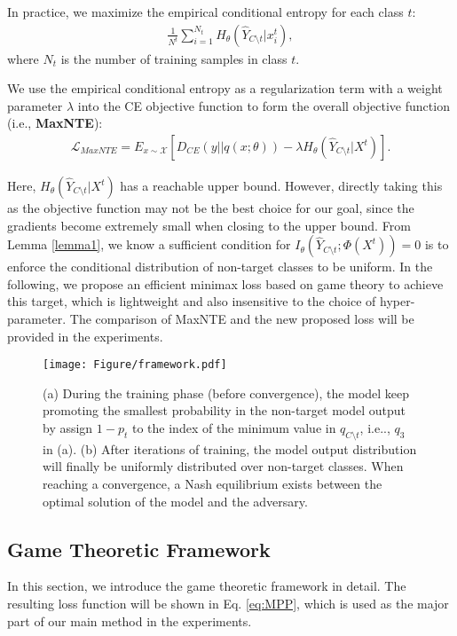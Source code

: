 \documentclass{article}
\theoremstyle{definition}
\begin{document}
In practice, we maximize the empirical conditional entropy for each class $t$:
\begin{align}\nonumber
    \frac{1}{N^t} \sum_{i=1}^{N_t} H_{\theta}(\hat{Y}_{C\setminus t}|x^t_i),
\end{align}
where $N_t$ is the number of training samples in class $t$.

We use the empirical conditional entropy as a regularization term with a weight parameter $\lambda$ into the CE objective function to form the overall objective function (i.e., \textbf{MaxNTE}):
\begin{align}
    \mathcal{L}_{MaxNTE} = {E}_{x\sim\mathcal{X}}[ D_{CE}(y||q(x;\theta)) - \lambda H_{\theta}(\hat{Y}_{C\setminus t}|X^t)].
    \label{equ:objective3}
\end{align}

Here, $H_{\theta}(\hat{Y}_{C\setminus t}|X^t)$ has a reachable upper bound. However, directly taking this as the objective function may not be the best choice for our goal, since the gradients become extremely small when closing to the upper bound. From Lemma \ref{lemma1}, we know a sufficient condition for $I_{\theta}(\hat{Y}_{C\setminus t};\Phi(X^t))=0$ is to enforce the conditional distribution of non-target classes to be uniform. In the following, we propose an efficient minimax loss based on game theory to achieve this target, which is lightweight and also insensitive to the choice of hyper-parameter. The comparison of MaxNTE and the new proposed loss will be provided in the experiments.
\begin{figure*}[t]
    \centering\centerline{\texttt{[image: Figure/framework.pdf]}}
    \caption{(a) During the training phase (before convergence), the model keep promoting the smallest probability in the non-target model output by assign $1-p_{t}$ to the index of the minimum value in $q_{C\setminus t}$, i.e.., $q_{3}$ in (a). (b) After iterations of training, the model output distribution will finally be uniformly distributed over non-target classes. When reaching a convergence, a Nash equilibrium exists between the optimal solution of the model and the adversary.}
    \label{fig:overview}
\end{figure*}
\subsection{Game Theoretic Framework}
In this section, we introduce the game theoretic framework in detail. The resulting loss function will be shown in Eq. \ref{eq:MPP}, which is used as the major part of our main method in the experiments.
\end{document}
